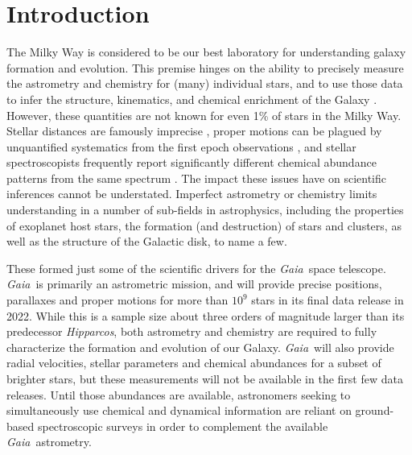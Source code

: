 \documentclass[preprint,trackchanges]{aastex}
\newcommand{\project}[1]{\textsl{#1}}
\newcommand{\gaia}{\project{Gaia}}
\newcommand{\hipparcos}{\project{Hipparcos}}
\begin{document}
\keywords{\vspace{5em}}



\section{Introduction} 
\label{sec:introduction}

The Milky Way is considered to be our best laboratory for understanding galaxy
formation and evolution.  This premise hinges on the ability to precisely measure 
the astrometry and chemistry for (many) individual stars, and to use those data 
to infer the structure, kinematics, and chemical enrichment of the Galaxy 
\citep[e.g.,][]{Schlaufman_2009,Deason_2011,Ness_2012,Ness_2013a,Ness_2013b,
Casey_2012,Casey_2013,Casey_2014a,Casey_2014b,Kordopatis_2015,Bovy_2016}.  
However, these quantities are not known for even 1\% of stars in the Milky Way.  Stellar distances are famously imprecise \citep[e.g.,][]{van_Leeuwen_2007,
Jofre_2015,Madler_2016}, proper motions can be plagued by unquantified systematics 
from the first epoch observations \citep[e.g.,][]{Casey_Schlaufman_2015}, and 
stellar spectroscopists frequently report significantly different chemical 
abundance patterns from the same spectrum \citep{Smiljanic_2014}.  The impact 
these issues have on scientific inferences cannot be understated.  Imperfect 
astrometry or chemistry limits understanding in a number of sub-fields in
astrophysics, including the properties of exoplanet host stars, the formation 
(and destruction) of stars and clusters, as well as the structure of the 
Galactic disk, to name a few.


These formed just some of the scientific drivers for the \gaia\ space telescope.
\gaia\ is primarily an astrometric mission, and will provide precise positions,
parallaxes and proper motions for more than $10^9$ stars in its final data
release in 2022.  While this is a sample size about three orders of magnitude 
larger than its predecessor \hipparcos, both astrometry and chemistry are 
required to fully characterize the formation and evolution of our Galaxy. 
\gaia\ will also provide radial velocities, stellar parameters and chemical 
abundances for a subset of brighter stars, but these measurements will not be 
available in the first few data releases. Until those abundances are available,
astronomers seeking to simultaneously use chemical and dynamical information are
reliant on ground-based spectroscopic surveys in order to complement the 
available \gaia\ astrometry.
\end{document}
